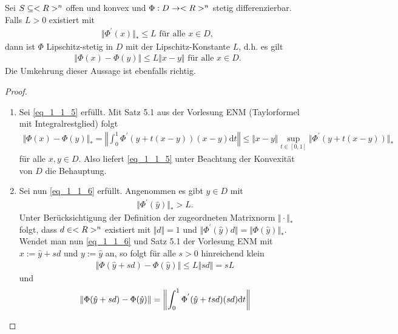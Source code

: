 \begin{lemma}
	Sei $S \subseteq <R>^n$ offen und konvex und $\Phi: D \to <R>^n$ stetig differenzierbar. Falls $L > 0$ existiert mit
	\begin{align}
		\Vert \Phi^{'}(x) \Vert_{\ast} \le L \text{ für alle } x \in D, \label{eq_1_1_5}
	\end{align}
	dann ist $\Phi$ Lipschitz-stetig in $D$ mit der Lipschitz-Konstante $L$, d.h. es gilt
	\begin{align}
		\Vert \Phi(x) - \Phi(y)\Vert \le L \Vert x-y \Vert \text{ für alle } x \in D. \label{eq_1_1_6}
	\end{align}
	Die Umkehrung dieser Aussage ist ebenfalls richtig.
\end{lemma}

\begin{proof}
	\begin{enumerate}
		\item Sei \ref{eq_1_1_5} erfüllt. Mit Satz 5.1 aus der Vorlesung ENM (Taylorformel mit Integralrestglied) folgt %
		\begin{align}
            \Vert \Phi(x) - \Phi(y) \Vert_{\ast} = \left\Vert \int_{0}^{1} \Phi^{'}(y + t(x-y))(x-y) \mathrm{d}t \right\Vert \le \Vert x-y \Vert \sup_{t \in [0,1]} \Vert \Phi^{'}(y+t(x-y))\Vert_{\ast}
		\end{align} %
		für alle $x,y \in D$. Also liefert \ref{eq_1_1_5} unter Beachtung der Konvexität von $D$ die Behauptung.
		\item Sei nun \ref{eq_1_1_6} erfüllt. Angenommen es gibt $\hat{y} \in D$ mit
		\begin{align}
			\Vert \Phi^{'}(\hat{y})\Vert_{\ast} > L. \label{eq_1_1_7}
		\end{align}
		Unter Berücksichtigung der Definition der zugeordneten Matrixnorm $\Vert \cdot \Vert_{\ast}$ folgt, dass $d \in <R>^n$ existiert mit $\Vert d \Vert = 1$ und $\Vert \Phi^{'}(\hat{y})d\Vert = \Vert \Phi(\hat{y}) \Vert_{\ast}$. Wendet man nun \ref{eq_1_1_6} und Satz 5.1 der Vorlesung ENM mit $x := \hat{y} + sd$ und $y := \hat{y}$ an, so folgt für alle $s > 0$ hinreichend klein
		\begin{align}
			\Vert \Phi(\hat{y} + sd) - \Phi(\hat{y})\Vert \le L \Vert sd \Vert = sL
		\end{align}
		und 
		\begin{align}
			\Vert \Phi(\hat{y} + sd) - \Phi(\hat{y}) \Vert &= \left\Vert \int_{0}^{1} \Phi^{'}(\hat{y} + tsd)(sd)\mathrm{d}t \right\Vert\notag \\

\end{align}
\end{enumerate}
\end{proof}

